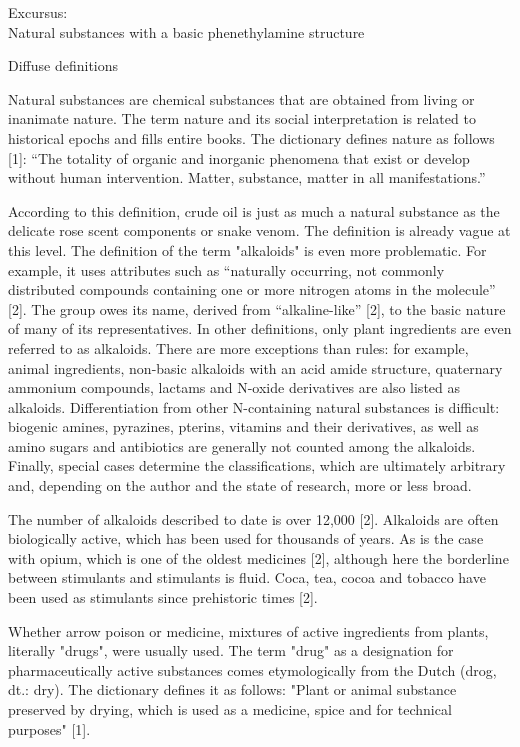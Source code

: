 \begin{center}
	Excursus:\\
	Natural substances with a basic phenethylamine structure
\bigbreak

Diffuse definitions
\bigbreak
\end{center}

Natural substances are chemical substances that are obtained from living or inanimate nature. The term nature and its social interpretation is related to historical epochs and fills entire books. The dictionary defines nature as follows [1]: “The totality of organic and inorganic phenomena that exist or develop without human intervention. Matter, substance, matter in all manifestations.”

According to this definition, crude oil is just as much a natural substance as the delicate rose scent components or snake venom. The definition is already vague at this level. The definition of the term "alkaloids" is even more problematic. For example, it uses attributes such as “naturally occurring, not commonly distributed compounds containing one or more nitrogen atoms in the molecule” [2]. The group owes its name, derived from “alkaline-like” [2], to the basic nature of many of its representatives. In other definitions, only plant ingredients are even referred to as alkaloids. There are more exceptions than rules: for example, animal ingredients, non-basic alkaloids with an acid amide structure, quaternary ammonium compounds, lactams and N-oxide derivatives are also listed as alkaloids. Differentiation from other N-containing natural substances is difficult: biogenic amines, pyrazines, pterins, vitamins and their derivatives, as well as amino sugars and antibiotics are generally not counted among the alkaloids. Finally, special cases determine the classifications, which are ultimately arbitrary and, depending on the author and the state of research, more or less broad.

The number of alkaloids described to date is over 12,000 [2]. Alkaloids are often biologically active, which has been used for thousands of years. As is the case with opium, which is one of the oldest medicines [2], although here the borderline between stimulants and stimulants is fluid. Coca, tea, cocoa and tobacco have been used as stimulants since prehistoric times [2].

Whether arrow poison or medicine, mixtures of active ingredients from plants, literally "drugs", were usually used. The term "drug" as a designation for pharmaceutically active substances comes etymologically from the Dutch (drog, dt.: dry). The dictionary defines it as follows: "Plant or animal substance preserved by drying, which is used as a medicine, spice and for technical purposes" [1].  

